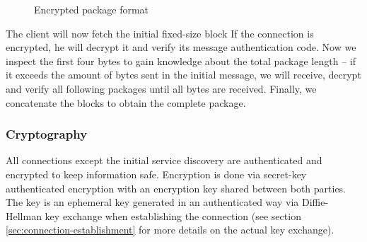 \begin{figure}
    \center


    \caption{Encrypted package format}
    \label{fig:encrypted-package-format}
\end{figure}

The client will now fetch the initial fixed-size block
If the connection is encrypted, he will decrypt it and verify its message authentication code.
Now we inspect the first four bytes to gain knowledge about the total package length -- if it exceeds the amount of bytes sent in the initial message, we will receive, decrypt and verify all following packages until all bytes are received.
Finally, we concatenate the blocks to obtain the complete package.

\subsubsection{Cryptography}

All connections except the initial service discovery are authenticated and encrypted to keep information safe.
Encryption is done via secret-key authenticated encryption with an encryption key shared between both parties.
The key is an ephemeral key generated in an authenticated way via Diffie-Hellman key exchange when establishing the connection (see section \ref{sec:connection-establishment} for more details on the actual key exchange).

